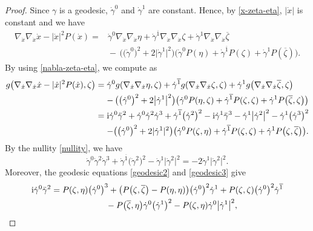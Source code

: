 \documentclass[11pt]{article}
\numberwithin{equation}{section}
\newcommand\ol{\overline}
\numberwithin{equation}{section}
\begin{document}
\begin{proof}
Since $\gamma$ is a geodesic, $\dot\gamma^0$ and $\dot\gamma^1$ are constant.
Hence, by \eqref{x-zeta-eta}, $|\dot x|$ is constant and we have
\begin{align*}
\nabla_{\dot x}\nabla_{\dot x}\dot x-|\dot x|^2P(\dot x)
=&\dot\gamma^0\nabla_{\dot x}\nabla_{\dot x}\eta+
\dot\gamma^{\ol1}\nabla_{\dot x}\nabla_{\dot x}\zeta+\dot\gamma^1\nabla_{\dot x}\nabla_{\dot x}\ol\zeta \\
&{}{-}\,\bigl(\bigl(\dot\gamma^0\bigr)^2+2\bigl|\dot\gamma^1\bigr|^2\bigr)\bigl(\dot\gamma^0P(\eta)+\dot\gamma^{\ol1}P(\zeta)+\dot\gamma^1P(\ol\zeta)\bigr).
\end{align*}
By using \eqref{nabla-zeta-eta}, we compute as
\begin{align*}
g\bigl(\nabla_{\dot x}\nabla_{\dot x}\dot x-|\dot x|^2P(\dot x) ,\zeta\bigr)
={}&\dot\gamma^0g(\nabla_{\dot x}\nabla_{\dot x}\eta, \zeta)+
\dot\gamma^{\ol1}g(\nabla_{\dot x}\nabla_{\dot x}\zeta, \zeta)+\dot\gamma^1g\bigl(\nabla_{\dot x}\nabla_{\dot x}\ol\zeta, \zeta\bigr) \\
&{}{-}\,\bigl(\bigl(\dot\gamma^0\bigr)^2+2\bigl|\dot\gamma^1\bigr|^2\bigr)\bigl(\dot\gamma^0P(\eta, \zeta)+\dot\gamma^{\ol1}P(\zeta, \zeta)+\dot\gamma^1P\bigl(\ol\zeta, \zeta\bigr)\bigr) \\
={}&{\rm i}\dot\gamma^0\ddot\gamma^2+\dot\gamma^0\dot\gamma^2\dot\gamma^3+\dot\gamma^{\ol1}\bigl(\dot\gamma^2\bigr)^2
-{\rm i}\dot\gamma^1\ddot\gamma^3-\dot\gamma^1\bigl|\dot\gamma^2\bigr|^2-\dot\gamma^1\bigl(\dot\gamma^3\bigr)^2 \\
&{}{-}\bigl(\bigl(\dot\gamma^0\bigr)^2+2|\dot\gamma^1|^2\bigr)\bigl(\dot\gamma^0P(\zeta, \eta)+\dot\gamma^{\ol1}P(\zeta, \zeta)+\dot\gamma^1P\bigl(\zeta, \ol\zeta\bigr)\bigr).
\end{align*}
By the nullity \eqref{nullity}, we have
\[
\dot\gamma^0\dot\gamma^2\dot\gamma^3+\dot\gamma^{\ol1}\bigl(\dot\gamma^2\bigr)^2 -\dot\gamma^1\bigl|\dot\gamma^2\bigr|^2=-2\dot\gamma^1\bigl|\dot\gamma^2\bigr|^2.
\]
Moreover, the geodesic equations \eqref{geodesic2} and \eqref{geodesic3} give
\begin{gather*}
{\rm i}\dot\gamma^0\ddot\gamma^2=P(\zeta, \eta)\bigl(\dot\gamma^0\bigr)^3+\bigl(P\bigl(\zeta, \ol\zeta\bigr)-P(\eta, \eta)\bigr)\bigl(\dot\gamma^0\bigr)^2\dot\gamma^1+P(\zeta, \zeta) \bigl(\dot\gamma^0\bigr)^2\dot\gamma^{\ol1} \\
\hphantom{{\rm i}\dot\gamma^0\ddot\gamma^2=}{}
-P\bigl(\ol\zeta, \eta\bigr)\dot\gamma^0\bigl(\dot\gamma^1\bigr)^2-P(\zeta, \eta)\dot\gamma^0\bigl|\dot\gamma^1\bigr|^2, \\

\end{gather*}
\end{proof}
\end{document}
